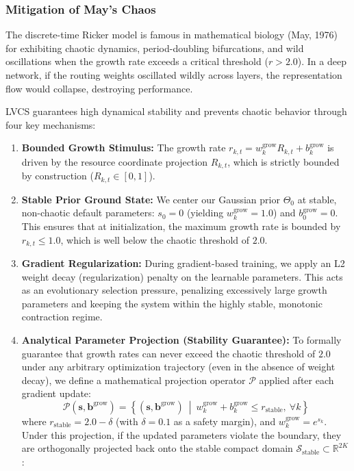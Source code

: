 \subsubsection{Mitigation of May's Chaos}
The discrete-time Ricker model is famous in mathematical biology (May, 1976) for exhibiting chaotic dynamics, period-doubling bifurcations, and wild oscillations when the growth rate exceeds a critical threshold ($r > 2.0$). In a deep network, if the routing weights oscillated wildly across layers, the representation flow would collapse, destroying performance.

LVCS guarantees high dynamical stability and prevents chaotic behavior through four key mechanisms:
\begin{enumerate}
    \item \textbf{Bounded Growth Stimulus:} The growth rate $r_{k, t} = w_k^{\text{grow}} R_{k, t} + b_k^{\text{grow}}$ is driven by the resource coordinate projection $R_{k, t}$, which is strictly bounded by construction ($R_{k, t} \in [0, 1]$).
    \item \textbf{Stable Prior Ground State:} We center our Gaussian prior $\Theta_0$ at stable, non-chaotic default parameters: $s_0 = 0$ (yielding $w_k^{\text{grow}} = 1.0$) and $b_0^{\text{grow}} = 0$. This ensures that at initialization, the maximum growth rate is bounded by $r_{k, t} \le 1.0$, which is well below the chaotic threshold of $2.0$.
    \item \textbf{Gradient Regularization:} During gradient-based training, we apply an L2 weight decay (regularization) penalty on the learnable parameters. This acts as an evolutionary selection pressure, penalizing excessively large growth parameters and keeping the system within the highly stable, monotonic contraction regime.
    \item \textbf{Analytical Parameter Projection (Stability Guarantee):} To formally guarantee that growth rates can never exceed the chaotic threshold of $2.0$ under any arbitrary optimization trajectory (even in the absence of weight decay), we define a mathematical projection operator $\mathcal{P}$ applied after each gradient update:
    \begin{equation}
        \label{eq:projection_operator}
        \mathcal{P}(\mathbf{s}, \mathbf{b}^{\text{grow}}) = \left\{ (\mathbf{s}, \mathbf{b}^{\text{grow}}) \ \middle|\ w_k^{\text{grow}} + b_k^{\text{grow}} \le r_{\text{stable}}, \ \forall k \right\}
    \end{equation}
    where $r_{\text{stable}} = 2.0 - \delta$ (with $\delta = 0.1$ as a safety margin), and $w_k^{\text{grow}} = e^{s_k}$. Under this projection, if the updated parameters violate the boundary, they are orthogonally projected back onto the stable compact domain $\mathcal{S}_{\text{stable}} \subset \mathbb{R}^{2K}$:

\end{enumerate}
